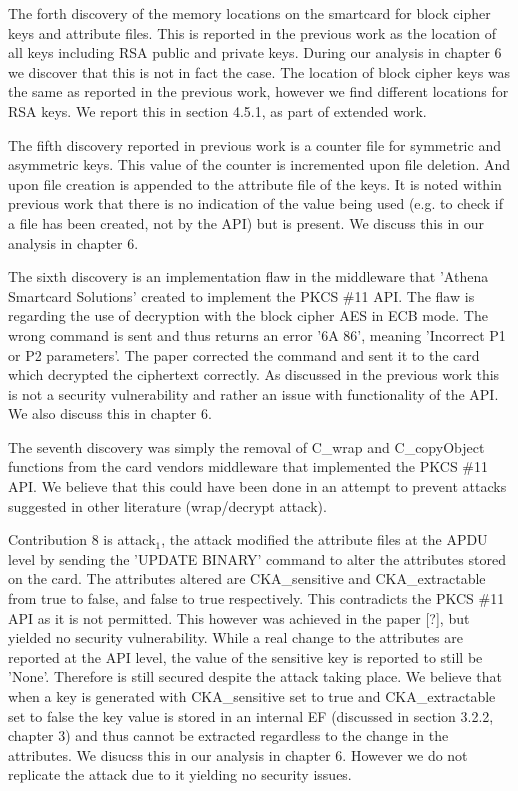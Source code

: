 \documentclass[bsc,frontabs,twoside,singlespacing,parskip,deptreport]{infthesis}     %
\begin{document}
The forth discovery of the memory locations on the smartcard for block cipher keys and attribute files. This is reported in the previous work as the location of all keys including RSA public and private keys. During our analysis in chapter 6 we discover that this is not in fact the case. The location of block cipher keys was the same as reported in the previous work, however we find different locations for RSA keys. We report this in section 4.5.1, as part of extended work.

The fifth discovery reported in previous work is a counter file for symmetric and asymmetric keys. This value of the counter is incremented upon file deletion. And upon file creation is appended to the attribute file of the keys. It is noted within previous work that there is no indication of the value being used (e.g. to check if a file has been created, not by the API) but is present. We discuss this in our analysis in chapter 6.

The sixth discovery is an implementation flaw in the middleware that 'Athena Smartcard Solutions' created to implement the PKCS \#11 API. The flaw is regarding the use of decryption with the block cipher AES in ECB mode. The wrong command is sent and thus returns an error '6A 86', meaning 'Incorrect P1 or P2 parameters'. The paper corrected the command and sent it to the card which decrypted the ciphertext correctly. As discussed in the previous work this is not a security vulnerability and rather an issue with functionality of the API. We also discuss this in chapter 6. 

The seventh discovery was simply the removal of C\_wrap and C\_copyObject functions from the card vendors middleware that implemented the PKCS \#11 API. We believe that this could have been done in an attempt to prevent attacks suggested in other literature (wrap/decrypt attack).

Contribution 8 is attack$_1$, the attack modified the attribute files at the APDU level by sending the 'UPDATE BINARY' command to alter the attributes stored on the card. The attributes altered are CKA\_sensitive and CKA\_extractable from true to false, and false to true respectively. This contradicts the PKCS \#11 API as it is not permitted. This however was achieved in the paper [?], but yielded no security vulnerability. While a real change to the attributes are reported at the API level, the value of the sensitive key is reported to still be 'None'. Therefore is still secured despite the attack taking place. We believe that when a key is generated with CKA\_sensitive set to true and CKA\_extractable set to false the key value is stored in an internal EF (discussed in section 3.2.2, chapter 3) and thus cannot be extracted regardless to the change in the attributes. We disucss this in our analysis in chapter 6. However we do not replicate the attack due to it yielding no security issues.
\end{document}
